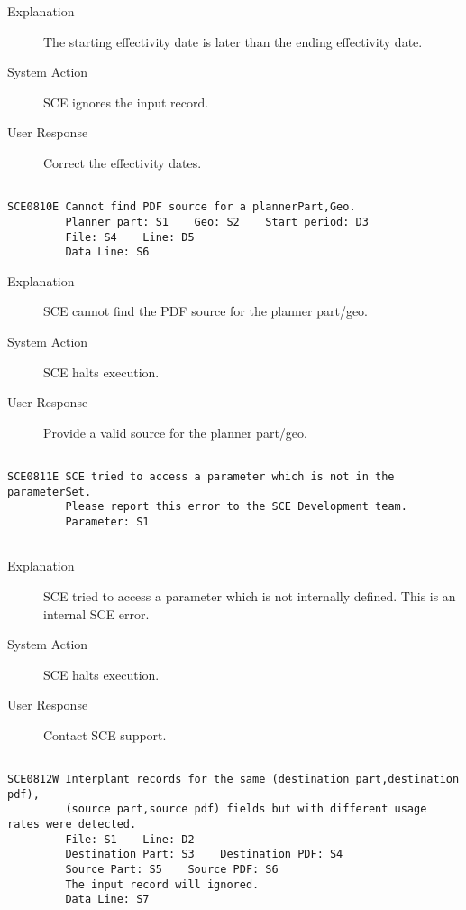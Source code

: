 \begin{description}
\item[Explanation]  The starting effectivity date is later than the ending effectivity date.

\item[System Action]  SCE ignores the input record.

\item[User Response]  Correct the effectivity dates.
\end{description}
\hrulefill
\begin{verbatim}

SCE0810E Cannot find PDF source for a plannerPart,Geo.
         Planner part: S1    Geo: S2    Start period: D3
         File: S4    Line: D5
         Data Line: S6
\end{verbatim}
\begin{description}
\item[Explanation]  SCE cannot find the PDF source for the planner part/geo.

\item[System Action]  SCE halts execution.

\item[User Response]  Provide a valid source for the planner part/geo.
\end{description}
\hrulefill
\begin{verbatim}

SCE0811E SCE tried to access a parameter which is not in the parameterSet.
         Please report this error to the SCE Development team.
         Parameter: S1
         
\end{verbatim}
\begin{description}
\item[Explanation]  SCE tried to access a parameter which is not internally defined.  This is an internal SCE error.

\item[System Action]  SCE halts execution.

\item[User Response]  Contact SCE support.
\end{description}
\hrulefill
\begin{verbatim}

SCE0812W Interplant records for the same (destination part,destination pdf),
         (source part,source pdf) fields but with different usage rates were detected.
         File: S1    Line: D2
         Destination Part: S3    Destination PDF: S4
         Source Part: S5    Source PDF: S6
         The input record will ignored.
         Data Line: S7
         
\end{verbatim}
